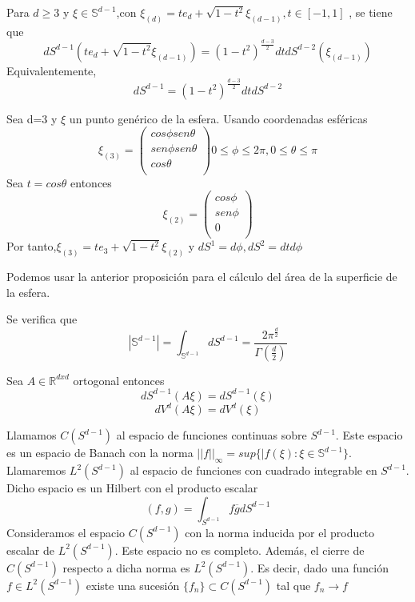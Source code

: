 \begin{prop}Para $d \ge 3$ y $\xi \in \mathds{S}^{d-1}$,con $\xi_{(d)} = te_d+\sqrt{1-t^2}\xi_{(d-1)},  t\in[-1,1]$ , se tiene que
	$$
	dS^{d-1}(te_d+\sqrt{1-t^2}\xi_{(d-1)}) = (1-t^2)^{\frac{d-3}{2}}dt  dS^{d-2}(\xi_{(d-1)})
	$$
	Equivalentemente,
	$$
	dS^{d-1} = (1-t^2)^{\frac{d-3}{2}}dt dS^{d-2}
	$$
\end{prop}
\begin{example}Sea d=3 y $\xi$ un punto genérico de la esfera. Usando coordenadas esféricas $$
	\xi_{(3)}=\begin{pmatrix}
	cos\phi sen\theta\\
	sen\phi sen\theta\\
	cos\theta\\
	\end{pmatrix}
	0 \le \phi \le 2\pi , 0 \le \theta \le \pi
	$$
	Sea $t=cos\theta$ entonces
	$$
	\xi_{(2)} = \begin{pmatrix}
	cos\phi\\
	sen\phi\\
	0\\
	\end{pmatrix}
	$$
	Por tanto,$ \xi_{(3)} = te_3 + \sqrt{1-t^2} \xi_{(2)}$ y $dS^1 = d\phi , dS^2 = dtd\phi$
	
\end{example}
Podemos usar la anterior proposición para el cálculo del área de la superficie de la esfera.
\begin{prop}Se verifica que
	$$
	|\mathds{S}^{d-1}| = \int_{\mathds{S}^{d-1}} dS^{d-1} = \frac{2\pi^\frac{d}{2}}{\Gamma(\frac{d}{2})}
	$$
\end{prop} 

\begin{prop}
	Sea $A\in\mathds{R}^{dxd}$ ortogonal entonces
	$$ dS^{d-1}(A\xi) =  dS^{d-1}(\xi)$$
	$$ dV^{d}(A\xi) =  dV^{d}(\xi)$$
\end{prop}

Llamamos $C(S^{d-1})$ al espacio de funciones continuas sobre  $S^{d-1}$. Este espacio es un espacio de Banach con la norma $ ||f||_\infty = sup \{ |f(\xi) : \xi\in \mathds{S}^{d-1}\}$. Llamaremos $L^2(S^{d-1})$ al espacio de funciones con cuadrado integrable en $S^{d-1}$. Dicho espacio es un Hilbert con el producto escalar$$ (f,g) = \int_{S^{d-1}} f\overline{g} dS^{d-1}
$$
Consideramos el espacio $C(S^{d-1})$ con la norma inducida por el producto escalar de $L^2(S^{d-1})$. Este espacio no es completo. Además, el cierre de $C(S^{d-1})$ respecto a dicha norma es $L^2(S^{d-1})$. Es decir, dado una función $f\in L^2(S^{d-1})$ existe una sucesión $\{f_n\} \subset C(S^{d-1})$ tal que ${f_n}\to f$


